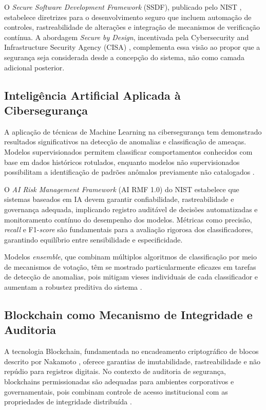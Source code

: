 \documentclass[12pt,a4paper]{article}
\begin{document}
O \textit{Secure Software Development Framework} (SSDF), publicado pelo NIST \cite{nist2022}, estabelece diretrizes para o desenvolvimento seguro que incluem automação de controles, rastreabilidade de alterações e integração de mecanismos de verificação contínua. A abordagem \textit{Secure by Design}, incentivada pela Cybersecurity and Infrastructure Security Agency (CISA) \cite{cisa2023}, complementa essa visão ao propor que a segurança seja considerada desde a concepção do sistema, não como camada adicional posterior.

\subsection{Inteligência Artificial Aplicada à Cibersegurança}

A aplicação de técnicas de Machine Learning na cibersegurança tem demonstrado resultados significativos na detecção de anomalias e classificação de ameaças. Modelos supervisionados permitem classificar comportamentos conhecidos com base em dados históricos rotulados, enquanto modelos não supervisionados possibilitam a identificação de padrões anômalos previamente não catalogados \cite{goodfellow2016}.

O \textit{AI Risk Management Framework} (AI RMF 1.0) do NIST \cite{nist2023ai} estabelece que sistemas baseados em IA devem garantir confiabilidade, rastreabilidade e governança adequada, implicando registro auditável de decisões automatizadas e monitoramento contínuo do desempenho dos modelos. Métricas como precisão, \textit{recall} e F1-\textit{score} são fundamentais para a avaliação rigorosa dos classificadores, garantindo equilíbrio entre sensibilidade e especificidade.

Modelos \textit{ensemble}, que combinam múltiplos algoritmos de classificação por meio de mecanismos de votação, têm se mostrado particularmente eficazes em tarefas de detecção de anomalias, pois mitigam vieses individuais de cada classificador e aumentam a robustez preditiva do sistema \cite{scikit2024}.

\subsection{Blockchain como Mecanismo de Integridade e Auditoria}

A tecnologia Blockchain, fundamentada no encadeamento criptográfico de blocos descrito por Nakamoto \cite{nakamoto2008}, oferece garantias de imutabilidade, rastreabilidade e não repúdio para registros digitais. No contexto de auditoria de segurança, blockchains permissionadas são adequadas para ambientes corporativos e governamentais, pois combinam controle de acesso institucional com as propriedades de integridade distribuída \cite{nist2018blockchain}.
\end{document}
